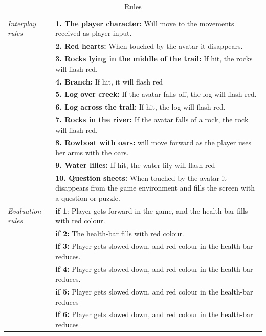 \begin{table} [H]
\centering
\begin{tabular}{|p{}|p{}|}
\hline
\emph{Interplay rules} & \textbf{1. The player character:} Will move to the movements received as player input. \\ \cline{2-2}
&  \textbf{2. Red hearts:} When touched by the avatar it disappears. \\ \cline{2-2}
& \textbf{3. Rocks lying in the middle of the trail:} If hit, the  rocks will flash red.  \\ \cline{2-2}
&  \textbf{4. Branch:} If hit, it will flash red \\ \cline{2-2}
& \textbf{5. Log over creek:} If the avatar falls off, the log will flash red. \\ \cline{2-2}
& \textbf{6. Log across the trail:} If hit, the log will flash red.  \\ \cline{2-2}
& \textbf{7. Rocks in the river:} If the avatar falls of a rock, the rock will flash red.  \\ \cline{2-2}
& \textbf{8. Rowboat with oars:} will move forward as the player  uses her arms with the oars. \\ \cline{2-2}
& \textbf{9. Water lilies:} If hit, the water lily will flash red \\ \cline{2-2}
&  \textbf{10. Question sheets:} When touched by the avatar  it  disappears from the game environment and fills the screen with  a  question or puzzle. \\ \hline
\emph{Evaluation rules} & \textbf{if 1}: Player gets forward in the game, and the health-bar fills with red colour. \\ \cline{2-2}
& \textbf{if 2:} The health-bar fills with red colour.  \\ \cline{2-2}
& \textbf{if 3:} Player gets slowed down, and red colour in the health-bar reduces.   \\ \cline{2-2}
& \textbf{if 4:} Player gets slowed down, and red colour in the health-bar reduces.  \\ \cline{2-2}
& \textbf{if 5:} Player gets slowed down, and red colour in the health-bar reduces   \\ \cline{2-2}
& \textbf{if 6:} Player gets slowed down, and red colour in the health-bar reduces   \\ \hline
\end{tabular}
\caption[Rules in the "Nature Trail" game]{Rules}
\label{tab:rules1}
\end{table} 

